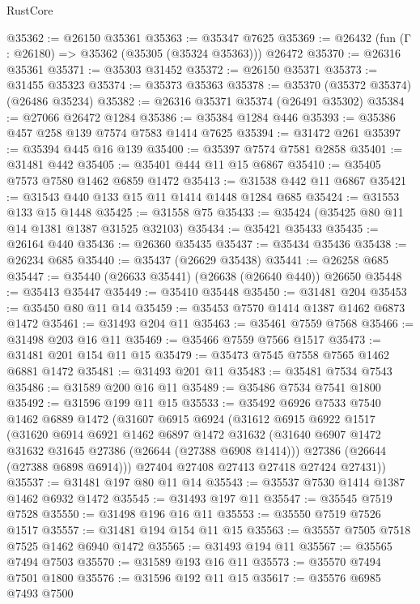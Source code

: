 \begin{lexlean}{RustCore}
\begin{coremodule}
@35362 := @26150 @35361
@35363 := @35347 @7625
@35369 := @26432 (fun (Γ : @26180) => @35362 (@35305 (@35324 @35363))) @26472
@35370 := @26316 @35361
@35371 := @35303 @31452
@35372 := @26150 @35371
@35373 := @31455 @35323
@35374 := @35373 @35363
@35378 := @35370 (@35372 @35374) (@26486 @35234)
@35382 := @26316 @35371 @35374 (@26491 @35302)
@35384 := @27066 @26472 @1284
@35386 := @35384 @1284 @446
@35393 := @35386 @457 @258 @139 @7574 @7583 @1414 @7625
@35394 := @31472 @261
@35397 := @35394 @445 @16 @139
@35400 := @35397 @7574 @7581 @2858
@35401 := @31481 @442
@35405 := @35401 @444 @11 @15 @6867
@35410 := @35405 @7573 @7580 @1462 @6859 @1472
@35413 := @31538 @442 @11 @6867
@35421 := @31543 @440 @133 @15 @11 @1414 @1448 @1284 @685
@35424 := @31553 @133 @15 @1448
@35425 := @31558 @75
@35433 := @35424 (@35425 @80 @11 @14 @1381 @1387 @31525 @32103)
@35434 := @35421 @35433
@35435 := @26164 @440
@35436 := @26360 @35435
@35437 := @35434 @35436
@35438 := @26234 @685
@35440 := @35437 (@26629 @35438)
@35441 := @26258 @685
@35447 := @35440 (@26633 @35441) (@26638 (@26640 @440)) @26650
@35448 := @35413 @35447
@35449 := @35410 @35448
@35450 := @31481 @204
@35453 := @35450 @80 @11 @14
@35459 := @35453 @7570 @1414 @1387 @1462 @6873 @1472
@35461 := @31493 @204 @11
@35463 := @35461 @7559 @7568
@35466 := @31498 @203 @16 @11
@35469 := @35466 @7559 @7566 @1517
@35473 := @31481 @201 @154 @11 @15
@35479 := @35473 @7545 @7558 @7565 @1462 @6881 @1472
@35481 := @31493 @201 @11
@35483 := @35481 @7534 @7543
@35486 := @31589 @200 @16 @11
@35489 := @35486 @7534 @7541 @1800
@35492 := @31596 @199 @11 @15
@35533 := @35492
    @6926
    @7533
    @7540
    @1462
    @6889
    @1472
    (@31607
      @6915
      @6924
      (@31612
        @6915
        @6922
        @1517
        (@31620
          @6914
          @6921
          @1462
          @6897
          @1472
          @31632
          (@31640 @6907 @1472 @31632 @31645 @27386 (@26644 (@27388 @6908 @1414)))
          @27386
          (@26644 (@27388 @6898 @6914)))
        @27404
        @27408
        @27413
        @27418
        @27424
        @27431))
@35537 := @31481 @197 @80 @11 @14
@35543 := @35537 @7530 @1414 @1387 @1462 @6932 @1472
@35545 := @31493 @197 @11
@35547 := @35545 @7519 @7528
@35550 := @31498 @196 @16 @11
@35553 := @35550 @7519 @7526 @1517
@35557 := @31481 @194 @154 @11 @15
@35563 := @35557 @7505 @7518 @7525 @1462 @6940 @1472
@35565 := @31493 @194 @11
@35567 := @35565 @7494 @7503
@35570 := @31589 @193 @16 @11
@35573 := @35570 @7494 @7501 @1800
@35576 := @31596 @192 @11 @15
@35617 := @35576
    @6985
    @7493
    @7500

\end{coremodule}
\end{lexlean}
